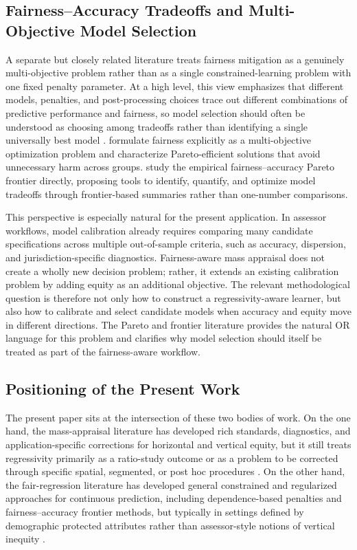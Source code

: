 \documentclass[12pt, draft]{article}
\theoremstyle{plain}
\theoremstyle{definition}
\newcommand{\1}{\mathbf{1}}
\begin{document}
\subsection{Fairness--Accuracy Tradeoffs and Multi-Objective Model Selection}

A separate but closely related literature treats fairness mitigation as a genuinely multi-objective problem rather than as a single constrained-learning problem with one fixed penalty parameter. At a high level, this view emphasizes that different models, penalties, and post-processing choices trace out different combinations of predictive performance and fairness, so model selection should often be understood as choosing among tradeoffs rather than identifying a single universally best model \cite{CatonHaas2024}. \textcite{martinez2020minimax} formulate fairness explicitly as a multi-objective optimization problem and characterize Pareto-efficient solutions that avoid unnecessary harm across groups. \textcite{little2022fairness} study the empirical fairness--accuracy Pareto frontier directly, proposing tools to identify, quantify, and optimize model tradeoffs through frontier-based summaries rather than one-number comparisons.

This perspective is especially natural for the present application. In assessor workflows, model calibration already requires comparing many candidate specifications across multiple out-of-sample criteria, such as accuracy, dispersion, and jurisdiction-specific diagnostics. Fairness-aware mass appraisal does not create a wholly new decision problem; rather, it extends an existing calibration problem by adding equity as an additional objective. The relevant methodological question is therefore not only how to construct a regressivity-aware learner, but also how to calibrate and select candidate models when accuracy and equity move in different directions. The Pareto and frontier literature provides the natural OR language for this problem and clarifies why model selection should itself be treated as part of the fairness-aware workflow.

\subsection{Positioning of the Present Work}

The present paper sits at the intersection of these two bodies of work. On the one hand, the mass-appraisal literature has developed rich standards, diagnostics, and application-specific corrections for horizontal and vertical equity, but it still treats regressivity primarily as a ratio-study outcome or as a problem to be corrected through specific spatial, segmented, or post hoc procedures \cite{Quintos2014,IAAO2023VerticalReview,BidansetEtAl2019,CandoganHanLu2023}. On the other hand, the fair-regression literature has developed general constrained and regularized approaches for continuous prediction, including dependence-based penalties and fairness--accuracy frontier methods, but typically in settings defined by demographic protected attributes rather than assessor-style notions of vertical inequity \cite{AgarwalDudikWu2019,LiEtAl2022Fairness,lee2022maximal,martinez2020minimax,little2022fairness}.
\end{document}
